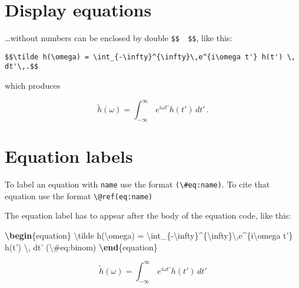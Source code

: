 \documentclass[]{book}
\newenvironment{Shaded}{\begin{snugshade}}{\end{snugshade}}
\newcommand{\ExtensionTok}[1]{#1}
\newcommand{\KeywordTok}[1]{\textcolor[rgb]{0.13,0.29,0.53}{\textbf{#1}}}
\newcommand{\NormalTok}[1]{#1}
\newcommand{\SpecialCharTok}[1]{\textcolor[rgb]{0.00,0.00,0.00}{#1}}
\newcommand{\SpecialStringTok}[1]{\textcolor[rgb]{0.31,0.60,0.02}{#1}}
\begin{document}
\hypertarget{display-equations}{%
\section{Display equations}\label{display-equations}}

\ldots{}without numbers can be enclosed by double \texttt{\$\$\ \ \$\$}, like this:

\begin{verbatim}
$$\tilde h(\omega) = \int_{-\infty}^{\infty}\,e^{i\omega t'} h(t') \, dt'\,.$$
\end{verbatim}

which produces

\[\tilde h(\omega) = \int_{-\infty}^{\infty}\,e^{i\omega t'} h(t') \, dt'\,.\]

\hypertarget{equation-labels}{%
\section{Equation labels}\label{equation-labels}}

To label an equation with \texttt{name} use the format \texttt{(\textbackslash{}\#eq:name)}.
To cite that equation use the format \texttt{\textbackslash{}@ref(eq:name)}

The equation label has to appear after the body of the equation code, like this:

\begin{Shaded}
\begin{Highlighting}[]
\KeywordTok{\textbackslash{}begin}\NormalTok{\{}\ExtensionTok{equation}\NormalTok{\}}\SpecialStringTok{ }
\SpecialStringTok{  }\SpecialCharTok{\textbackslash{}tilde}\SpecialStringTok{ h(}\SpecialCharTok{\textbackslash{}omega}\SpecialStringTok{) = }\SpecialCharTok{\textbackslash{}int}\SpecialStringTok{_\{-}\SpecialCharTok{\textbackslash{}infty}\SpecialStringTok{\}^\{}\SpecialCharTok{\textbackslash{}infty}\SpecialStringTok{\}}\SpecialCharTok{\textbackslash{},}\SpecialStringTok{e^\{i}\SpecialCharTok{\textbackslash{}omega}\SpecialStringTok{ t'\} h(t') }\SpecialCharTok{\textbackslash{},}\SpecialStringTok{ dt'}
\SpecialStringTok{  (}\SpecialCharTok{\textbackslash{}#}\SpecialStringTok{eq:binom)}
\KeywordTok{\textbackslash{}end}\NormalTok{\{}\ExtensionTok{equation}\NormalTok{\} }
\end{Highlighting}
\end{Shaded}

\begin{equation}
  \tilde h(\omega) = \int_{-\infty}^{\infty}\,e^{i\omega t'} h(t') \, dt'
  \label{eq:binom}
\end{equation}
\end{document}
